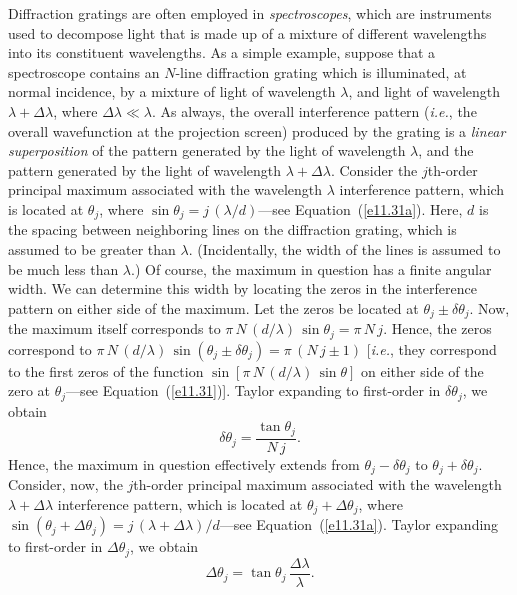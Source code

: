 Diffraction gratings are often employed in {\em spectroscopes}, which are instruments used to decompose light that is
made up of a mixture of different wavelengths into its
constituent wavelengths. As a simple example, suppose that a spectroscope contains an $N$-line diffraction grating which is illuminated, at normal  incidence, 
by a mixture of light of wavelength $\lambda$, and light of wavelength $\lambda+\Delta\lambda$, where
$\Delta\lambda\ll \lambda$. As always, the overall interference pattern ({\em i.e.}, the overall  wavefunction at the projection screen) produced by the grating is a {\em linear superposition}\/
of the pattern generated by the light of wavelength $\lambda$, and the pattern generated by the
light of wavelength $\lambda+\Delta\lambda$. Consider the $j$th-order principal maximum associated
with the wavelength $\lambda$ interference pattern, which is located at $\theta_j$, where $\sin\theta_j = j\,(\lambda/d)$---see Equation~(\ref{e11.31a}). Here, $d$ is
the spacing between neighboring  lines on the diffraction grating, which is assumed to be greater than $\lambda$.  (Incidentally, the
width of the lines is assumed to be much less than $\lambda$.)
Of course, the maximum in question has a finite angular width.
We can determine this width by locating the zeros in the interference pattern on either side of the maximum. Let the zeros
be 
 located at $\theta_j\pm \delta\theta_j$. 
Now, the maximum itself corresponds to $\pi\,N\,(d/\lambda)\,\sin\theta_j = \pi\,N\,j$. Hence, the 
zeros correspond to $\pi\,N\,(d/\lambda)\,\sin(\theta_j\pm\delta\theta_j)= \pi\,(N\,j\pm 1)$ [{\em i.e.},
they correspond to the first zeros of the function $\sin[\pi\,N\,(d/\lambda)\,\sin\theta]$ on either side of the zero at $\theta_j$---see Equation~(\ref{e11.31})]. 
Taylor expanding to first-order in $\delta\theta_j$, we obtain
\begin{equation}\label{e11.35}
\delta\theta_j = \frac{\tan\theta_j}{N\,j}.
\end{equation}
Hence, the maximum in question effectively extends from $\theta_j-\delta\theta_j$ to $\theta_j+\delta\theta_j$. 
Consider, now, the $j$th-order principal maximum associated  with the wavelength $\lambda+\Delta\lambda$ interference pattern, which is
located at $\theta_j+\Delta\theta_j$, where $\sin(\theta_j+\Delta\theta_j)= j\,(\lambda+\Delta\lambda)/d$---see Equation~(\ref{e11.31a}). Taylor
expanding to first-order in $\Delta\theta_j$, we obtain
\begin{equation}
\Delta\theta_j = \tan\theta_j\,\frac{\Delta\lambda}{\lambda}.
\end{equation}
